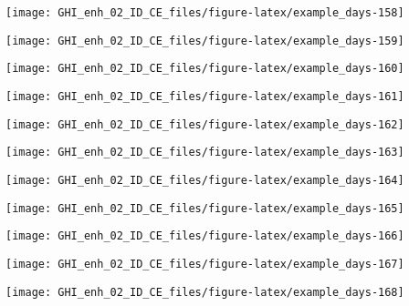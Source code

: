 \documentclass[
  10pt,
  a4paper,oneside]{article}
\begin{document}
\begin{center}\texttt{[image: GHI\_enh\_02\_ID\_CE\_files/figure-latex/example\_days-158]} \end{center}

\begin{center}\texttt{[image: GHI\_enh\_02\_ID\_CE\_files/figure-latex/example\_days-159]} \end{center}

\begin{center}\texttt{[image: GHI\_enh\_02\_ID\_CE\_files/figure-latex/example\_days-160]} \end{center}

\begin{center}\texttt{[image: GHI\_enh\_02\_ID\_CE\_files/figure-latex/example\_days-161]} \end{center}

\begin{center}\texttt{[image: GHI\_enh\_02\_ID\_CE\_files/figure-latex/example\_days-162]} \end{center}

\begin{center}\texttt{[image: GHI\_enh\_02\_ID\_CE\_files/figure-latex/example\_days-163]} \end{center}

\begin{center}\texttt{[image: GHI\_enh\_02\_ID\_CE\_files/figure-latex/example\_days-164]} \end{center}

\begin{center}\texttt{[image: GHI\_enh\_02\_ID\_CE\_files/figure-latex/example\_days-165]} \end{center}

\begin{center}\texttt{[image: GHI\_enh\_02\_ID\_CE\_files/figure-latex/example\_days-166]} \end{center}

\begin{center}\texttt{[image: GHI\_enh\_02\_ID\_CE\_files/figure-latex/example\_days-167]} \end{center}

\begin{center}\texttt{[image: GHI\_enh\_02\_ID\_CE\_files/figure-latex/example\_days-168]} \end{center}
\end{document}
